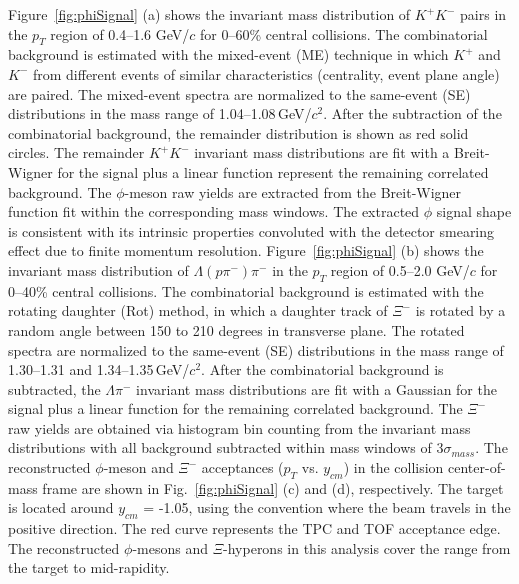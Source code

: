 \documentclass[%
 reprint,	
showpacs,
 amsmath,amssymb,
 aps,
 prc,
]{revtex4-1}
\begin{document}
Figure~\ref{fig:phiSignal} (a) shows the invariant mass distribution of $K^+K^-$ pairs in the $p_{T}$ region of 0.4--1.6 GeV/$c$ for 0--60\% central collisions. The combinatorial background is estimated with the mixed-event (ME) technique in which $K^+$ and $K^-$ from different events of similar characteristics (centrality, event plane angle) are paired. The mixed-event spectra are normalized to the same-event (SE) distributions in the mass range of 1.04--1.08\,GeV/$c^2$. After the subtraction of the combinatorial background, the remainder distribution is shown as red solid circles. The remainder $K^+K^-$ invariant mass distributions are fit with a Breit-Wigner for the signal plus a linear function represent the remaining correlated background. The $\phi$-meson raw yields are extracted from the Breit-Wigner function fit within the corresponding mass windows. The extracted $\phi$ signal shape is consistent with its intrinsic properties convoluted with the detector smearing effect due to finite momentum resolution.
Figure~\ref{fig:phiSignal} (b) shows the invariant mass distribution of $\Lambda(p\pi^-)\pi^-$ in the $p_{T}$ region of 0.5--2.0 GeV/$c$ for 0--40\% central collisions. The combinatorial background is estimated with the rotating daughter (Rot) method, in which a daughter track of $\Xi^-$ is rotated by a random angle between 150 to 210 degrees in transverse plane. The rotated spectra are normalized to the same-event (SE) distributions in the mass range of 1.30--1.31 and 1.34--1.35\,GeV/$c^2$. After the combinatorial background is subtracted, the $\Lambda\pi^-$ invariant mass distributions are fit with a Gaussian for the signal plus a linear function for the remaining correlated background. The $\Xi^-$ raw yields are obtained via histogram bin counting from the invariant mass distributions with all background subtracted within mass windows of 3$\sigma_{mass}$. The reconstructed $\phi$-meson and $\Xi^-$ acceptances ($p_T$ vs. $y_{cm}$) in the collision center-of-mass frame are shown in Fig.~\ref{fig:phiSignal} (c) and (d), respectively.
The target is located around $y_{cm}$ = -1.05, using the convention where the beam travels in the positive direction. The red curve represents the TPC and TOF acceptance edge. The reconstructed $\phi$-mesons and $\Xi$-hyperons in this analysis cover the range from the target to mid-rapidity.
\end{document}
